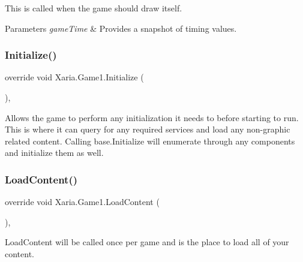 This is called when the game should draw itself. 


\begin{DoxyParams}{Parameters}
{\em game\+Time} & Provides a snapshot of timing values.\\
\hline
\end{DoxyParams}
\mbox{\label{classXaria_1_1Game1_a7510c981afe40f31d24c551b7cc73046}} 
\subsubsection{\texorpdfstring{Initialize()}{Initialize()}}
{\footnotesize\ttfamily override void Xaria.\+Game1.\+Initialize (\begin{DoxyParamCaption}{ }\end{DoxyParamCaption})\hspace{0.3cm}{\ttfamily [inline]}, {\ttfamily [protected]}}



Allows the game to perform any initialization it needs to before starting to run. This is where it can query for any required services and load any non-\/graphic related content. Calling base.\+Initialize will enumerate through any components and initialize them as well. 

\mbox{\label{classXaria_1_1Game1_a4593eda6c63d3242f6544e2357a08431}} 
\subsubsection{\texorpdfstring{Load\+Content()}{LoadContent()}}
{\footnotesize\ttfamily override void Xaria.\+Game1.\+Load\+Content (\begin{DoxyParamCaption}{ }\end{DoxyParamCaption})\hspace{0.3cm}{\ttfamily [inline]}, {\ttfamily [protected]}}



Load\+Content will be called once per game and is the place to load all of your content. 

\mbox{\label{classXaria_1_1Game1_a650e782700008533feec6ae84c19536a}} 
